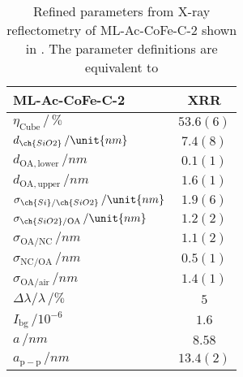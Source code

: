 \documentclass[\main/dresen_thesis.tex]{subfiles}
\begin{document}
  \begin{table}[!htbp]
    \centering
    \caption{\label{tab:monolayers:structure:squareArrayParacrystal:XRR}Refined parameters from X-ray reflectometry of ML-Ac-CoFe-C-2 shown in . The parameter definitions are equivalent to }
    \begin{tabular}{l | c}
      \hline
      ML-Ac-CoFe-C-2 & \textbf{XRR}\\
      \hline
      $\eta_\mathrm{Cube} \, /\, \%$                  & $53.6(6)$ \\
      $d_{\ch{SiO2}} \, / \unit{nm}$                  & $7.4(8)$ \\
      $d_{\mathrm{OA, lower}}\, / \unit{nm}$          & $0.1(1)$\\
      $d_{\mathrm{OA, upper}}\, / \unit{nm}$          & $1.6(1)$ \\
      $\sigma_{\ch{Si}/\ch{SiO2}} \, / \unit{nm}$     & $1.9(6)$ \\
      $\sigma_{\ch{SiO2}/\mathrm{OA}}\, / \unit{nm}$  & $1.2(2)$ \\
      $\sigma_\mathrm{OA/NC} \, / \unit{nm}$          & $1.1(2)$ \\
      $\sigma_\mathrm{NC/OA} \, / \unit{nm}$          & $0.5(1)$ \\
      $\sigma_\mathrm{OA/air} \, / \unit{nm}$         & $1.4(1)$ \\
      \hline
      $\Delta \lambda / \lambda\, / \unit{\%}$        & $5$ \\
      $I_\mathrm{bg} \, / \unit{10^{-6}}$             & $1.6$\\
      \hline
      $a \, / \unit{nm}$ & $8.58$ \\
      \hline
      $a_\mathrm{p-p} \, / \unit{nm}$ & $13.4(2)$ \\
      \hline
    \end{tabular}
  \end{table}
\end{document}
